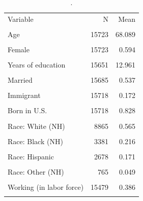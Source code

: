 \begin{table}[htbp]\centering\small
\caption{.}
\label{tab:demographics_general}
\begin{tabular}{lrr}\toprule
Variable & N & Mean \\\\ \midrule
Age & 15723 & 68.089 \\\\
Female & 15723 & 0.594 \\\\
Years of education & 15651 & 12.961 \\\\
Married & 15685 & 0.537 \\\\
Immigrant & 15718 & 0.172 \\\\
Born in U.S. & 15718 & 0.828 \\\\
Race: White (NH) & 8865 & 0.565 \\\\
Race: Black (NH) & 3381 & 0.216 \\\\
Race: Hispanic & 2678 & 0.171 \\\\
Race: Other (NH) & 765 & 0.049 \\\\
Working (in labor force) & 15479 & 0.386 \\\\
\bottomrule
\end{tabular}\end{table}
